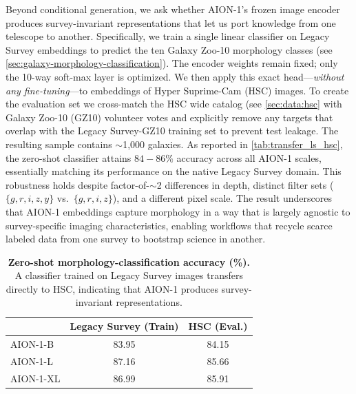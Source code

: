 \documentclass[]{polymathic}
\begin{document}
Beyond conditional generation, we ask whether AION-1’s frozen image encoder produces survey-invariant representations that let us port knowledge from one telescope to another. Specifically, we train a single linear classifier on Legacy Survey embeddings to predict the ten Galaxy Zoo-10 morphology classes (see \autoref{sec:galaxy-morphology-classification}).  The encoder weights remain fixed; only the 10-way soft-max layer is optimized.  We then apply this exact head—\emph{without any fine-tuning}—to embeddings of Hyper Suprime-Cam (HSC) images. To create the evaluation set we cross-match the HSC wide catalog (see \autoref{sec:data:hsc} with Galaxy Zoo-10 (GZ10) volunteer votes and explicitly remove any targets that overlap with the Legacy Survey-GZ10 training set to prevent test leakage.  The resulting sample contains ${\sim}$1,000 galaxies. As reported in \autoref{tab:transfer_ls_hsc}, the zero-shot classifier attains $84 - 86\%$ accuracy across all AION-1 scales, essentially matching its performance on the native Legacy Survey domain. This robustness holds despite factor-of-$\sim$2 differences in depth, distinct filter sets ($\{g,r,i,z,y\}$ vs.\ $\{g,r,i,z\}$), and a different pixel scale. The result underscores that AION-1 embeddings capture morphology in a way that is largely agnostic to survey-specific imaging characteristics, enabling workflows that recycle scarce labeled data from one survey to bootstrap science in another.

\begin{table}[ht]
  \centering
  \small
  \begin{tabular}{lcc}
    \toprule
                  & \textbf{Legacy Survey (Train)} & \textbf{HSC (Eval.)} \\
    \midrule
    AION-1-B      & 83.95 & 84.15 \\
    AION-1-L      & 87.16 & 85.66 \\
    AION-1-XL     & 86.99 & 85.91 \\
    \bottomrule
  \end{tabular}
  \caption{\textbf{Zero-shot morphology-classification accuracy (\%).}  
           A classifier trained on Legacy Survey images transfers directly to HSC, indicating that AION-1 produces survey-invariant representations.}
  \label{tab:transfer_ls_hsc}
\end{table}
\end{document}

